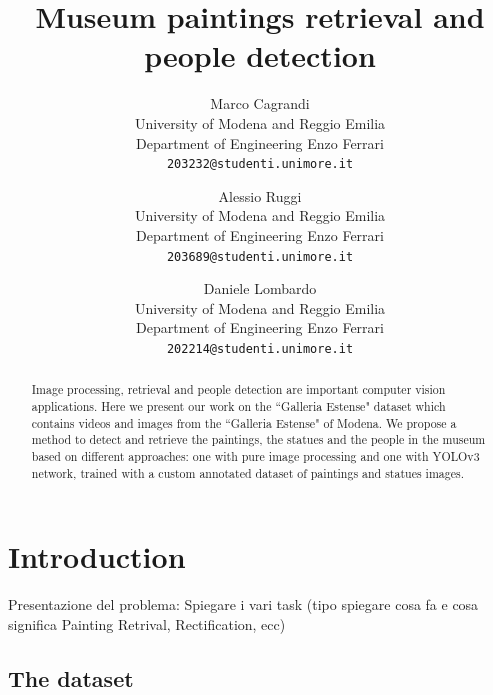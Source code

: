 \documentclass[10pt,twocolumn,letterpaper]{article}
\begin{document}
\title{Museum paintings retrieval and people detection}

\author{Marco Cagrandi\\
University of Modena and Reggio Emilia\\
Department of Engineering Enzo Ferrari\\
{\tt\small 203232@studenti.unimore.it}
\and
Alessio Ruggi\\
University of Modena and Reggio Emilia\\
Department of Engineering Enzo Ferrari\\
{\tt\small 203689@studenti.unimore.it}
\and
Daniele Lombardo\\
University of Modena and Reggio Emilia\\
Department of Engineering Enzo Ferrari\\
{\tt\small 202214@studenti.unimore.it}
}


\maketitle

\begin{abstract}
   Image processing, retrieval and people detection
   are important computer vision applications.
   Here we present our work on the ``Galleria Estense" dataset which contains
   videos and images from the ``Galleria Estense" of Modena.
   We propose a method to detect and retrieve the paintings, the statues and the people in the 
   museum based on different approaches: one with pure image processing and one 
   with YOLOv3 network, trained with a custom annotated dataset of paintings and statues 
   images. 
\end{abstract}

\section{Introduction}

Presentazione del problema:
Spiegare i vari task (tipo spiegare cosa fa e cosa significa Painting Retrival, Rectification, ecc)

\subsection{The dataset}
\end{document}
